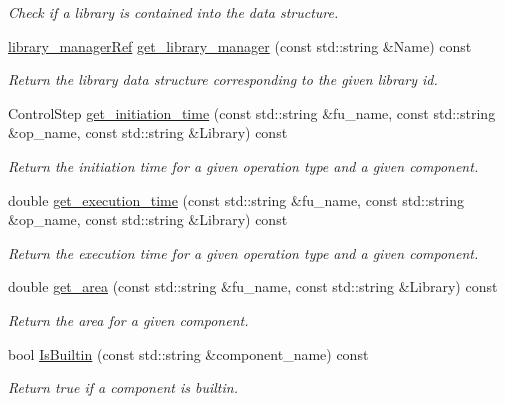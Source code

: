 \begin{Indent}
\begin{DoxyCompactItemize}
\begin{DoxyCompactList}\small\item\em Check if a library is contained into the data structure. \end{DoxyCompactList}\item 
\hyperlink{library__manager_8hpp_aacc6d633b0aa80ecfeb1180fd480ae68}{library\+\_\+manager\+Ref} \hyperlink{classtechnology__manager_af288b80068545def60e503ceddc109ae}{get\+\_\+library\+\_\+manager} (const std\+::string \&Name) const
\begin{DoxyCompactList}\small\item\em Return the library data structure corresponding to the given library id. \end{DoxyCompactList}\item 
Control\+Step \hyperlink{classtechnology__manager_a3ecefabcf1bf5c310eb41ceaca891420}{get\+\_\+initiation\+\_\+time} (const std\+::string \&fu\+\_\+name, const std\+::string \&op\+\_\+name, const std\+::string \&Library) const
\begin{DoxyCompactList}\small\item\em Return the initiation time for a given operation type and a given component. \end{DoxyCompactList}\item 
double \hyperlink{classtechnology__manager_ad7e2f48066e8764d8de84c9d9f9894c8}{get\+\_\+execution\+\_\+time} (const std\+::string \&fu\+\_\+name, const std\+::string \&op\+\_\+name, const std\+::string \&Library) const
\begin{DoxyCompactList}\small\item\em Return the execution time for a given operation type and a given component. \end{DoxyCompactList}\item 
double \hyperlink{classtechnology__manager_ad5be680d6dcff25992d05aa9ca8652b9}{get\+\_\+area} (const std\+::string \&fu\+\_\+name, const std\+::string \&Library) const
\begin{DoxyCompactList}\small\item\em Return the area for a given component. \end{DoxyCompactList}\item 
bool \hyperlink{classtechnology__manager_a32b1731a83b59180ae9eadb890b99486}{Is\+Builtin} (const std\+::string \&component\+\_\+name) const
\begin{DoxyCompactList}\small\item\em Return true if a component is builtin. \end{DoxyCompactList}\end{DoxyCompactItemize}
\end{Indent}
